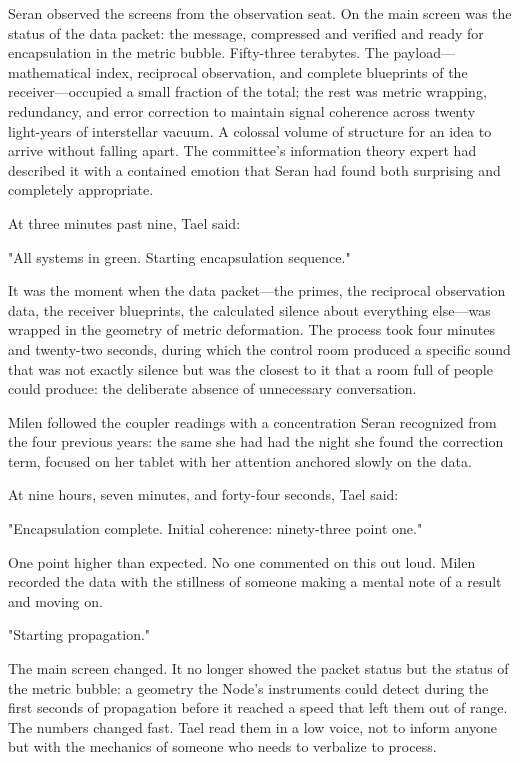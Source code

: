 \documentclass[11pt,a5paper,twoside]{book}
\begin{document}
Seran observed the screens from the observation seat. On the main screen was the status of the data packet: the message, compressed and verified and ready for encapsulation in the metric bubble. Fifty-three terabytes. The payload—mathematical index, reciprocal observation, and complete blueprints of the receiver—occupied a small fraction of the total; the rest was metric wrapping, redundancy, and error correction to maintain signal coherence across twenty light-years of interstellar vacuum. A colossal volume of structure for an idea to arrive without falling apart. The committee's information theory expert had described it with a contained emotion that Seran had found both surprising and completely appropriate.

At three minutes past nine, Tael said:

"All systems in green. Starting encapsulation sequence."

It was the moment when the data packet—the primes, the reciprocal observation data, the receiver blueprints, the calculated silence about everything else—was wrapped in the geometry of metric deformation. The process took four minutes and twenty-two seconds, during which the control room produced a specific sound that was not exactly silence but was the closest to it that a room full of people could produce: the deliberate absence of unnecessary conversation.

Milen followed the coupler readings with a concentration Seran recognized from the four previous years: the same she had had the night she found the correction term, focused on her tablet with her attention anchored slowly on the data.

At nine hours, seven minutes, and forty-four seconds, Tael said:

"Encapsulation complete. Initial coherence: ninety-three point one."

One point higher than expected. No one commented on this out loud. Milen recorded the data with the stillness of someone making a mental note of a result and moving on.

"Starting propagation."

The main screen changed. It no longer showed the packet status but the status of the metric bubble: a geometry the Node's instruments could detect during the first seconds of propagation before it reached a speed that left them out of range. The numbers changed fast. Tael read them in a low voice, not to inform anyone but with the mechanics of someone who needs to verbalize to process.
\end{document}
